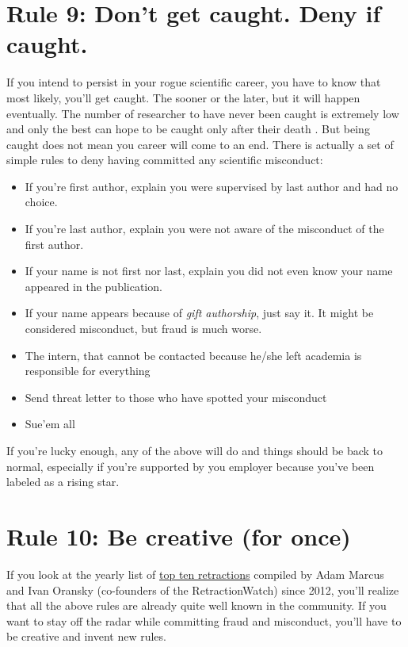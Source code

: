 \documentclass[a4paper,10pt,onecolumn]{article}
\begin{document}
\section*{Rule 9: Don't get caught. Deny if caught.}

If you intend to persist in your rogue scientific career, you have to know that
most likely, you'll get caught. The sooner or the later, but it will happen
eventually. The number of researcher to have never been caught is extremely low
and only the best can hope to be caught only after their death
\citep{degroote:2016,}. But being caught does not mean you career will come to
an end. There is actually a set of simple rules to deny having committed any
scientific misconduct:
\begin{itemize}
  \item If you're first author, explain you were supervised by last author and
    had no choice.
  \item If you're last author, explain you were not aware of the misconduct of
    the first author.
  \item If your name is not first nor last, explain you did not even know your
    name appeared in the publication.
  \item If your name appears because of {\em gift authorship}, just say it.
    It might be considered misconduct, but fraud is much worse.
  \item The intern, that cannot be contacted because he/she left academia is
    responsible for everything
  \item Send threat letter to those who have spotted your misconduct
  \item Sue'em all
\end{itemize}
If you're lucky enough, any of the above will do and things should be back to
normal, especially if you're supported by you employer because you've been
labeled as a rising star.

\section*{Rule 10: Be creative (for once)}

If you look at the yearly list of
\href{http://www.the-scientist.com/?articles.view/articleNo/47813/title/Top-10-Retractions-of-2016/}{top
  ten retractions} compiled by Adam Marcus and Ivan Oransky (co-founders of the
RetractionWatch) since 2012, you'll realize that all the above rules are
already quite well known in the community. If you want to stay off the radar
while committing fraud and misconduct, you'll have to be creative and invent
new rules. 
\end{document}
